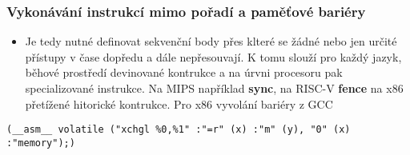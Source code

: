 \documentclass{beamer}
\begin{document}
\begin{frame}[fragile]
\frametitle{Vykonávání instrukcí mimo pořadí  a paměťové bariéry}

\begin{itemize}
 \item Je tedy nutné definovat sekvenční body přes klteré se žádné nebo jen určité přístupy v čase
       dopředu a dále nepřesouvají. K tomu slouží pro každý jazyk, běhové prostředí devinované
       kontrukce a na úrvni procesoru pak specializované instrukce. Na MIPS například \textbf{sync}, na RISC-V \textbf{fence}
       na x86 přetížené hitorické kontrukce. Pro x86 vyvolání bariéry z GCC
\end{itemize}

\begin{verbatim}
(__asm__ volatile ("xchgl %0,%1" :"=r" (x) :"m" (y), "0" (x) :"memory");)
\end{verbatim}
\end{frame}
\end{document}
